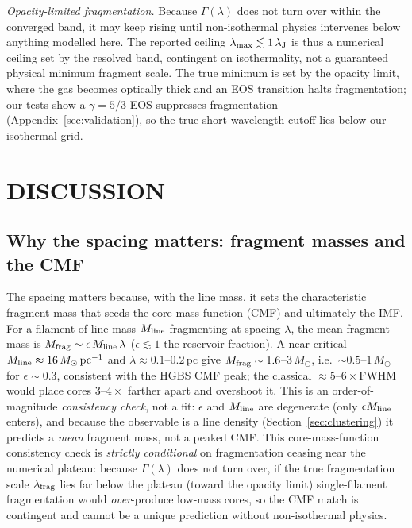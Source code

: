 \documentclass[usenatbib,twoside,twocolumn]{mnras}
\begin{document}
\emph{Opacity-limited fragmentation.} Because $\Gamma(\lambda)$ does not turn over within the converged band, it may keep rising until non-isothermal physics intervenes below anything modelled here. The reported ceiling $\lambda_{\rm max}\lesssim1\,\lambda_{\rm J}$ is thus a numerical ceiling set by the resolved band, contingent on isothermality, not a guaranteed physical minimum fragment scale. The true minimum is set by the opacity limit, where the gas becomes optically thick and an EOS transition halts fragmentation; our tests show a $\gamma=5/3$ EOS suppresses fragmentation (Appendix~\ref{sec:validation}), so the true short-wavelength cutoff lies below our isothermal grid.

\section{DISCUSSION}
\label{sec:discussion}

\subsection{Why the spacing matters: fragment masses and the CMF}
\label{sec:cmf}
The spacing matters because, with the line mass, it sets the characteristic fragment mass that seeds the core mass function (CMF) and ultimately the IMF. For a filament of line mass $M_{\rm line}$ fragmenting at spacing $\lambda$, the mean fragment mass is $M_{\rm frag}\sim\epsilon\,M_{\rm line}\,\lambda$ ($\epsilon\lesssim1$ the reservoir fraction). A near-critical $M_{\rm line}\approx16\,M_\odot\,{\rm pc^{-1}}$ and $\lambda\approx0.1$--$0.2$\,pc give $M_{\rm frag}\sim1.6$--$3\,M_\odot$, i.e.\ $\sim0.5$--$1\,M_\odot$ for $\epsilon\sim0.3$, consistent with the HGBS CMF peak; the classical $\approx5$--$6\times$FWHM would place cores $3$--$4\times$ farther apart and overshoot it. This is an order-of-magnitude \emph{consistency check}, not a fit: $\epsilon$ and $M_{\rm line}$ are degenerate (only $\epsilon M_{\rm line}$ enters), and because the observable is a line density (Section~\ref{sec:clustering}) it predicts a \emph{mean} fragment mass, not a peaked CMF. This core-mass-function consistency check is \emph{strictly conditional} on fragmentation ceasing near the numerical plateau: because $\Gamma(\lambda)$ does not turn over, if the true fragmentation scale $\lambda_{\rm frag}$ lies far below the plateau (toward the opacity limit) single-filament fragmentation would \emph{over}-produce low-mass cores, so the CMF match is contingent and cannot be a unique prediction without non-isothermal physics.
\end{document}
